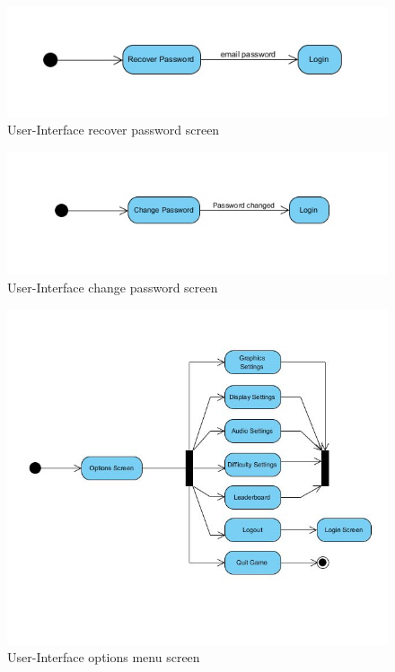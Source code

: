 \documentclass[letterpaper]{article}
\begin{document}
					\begin{figure}[H]
					\centering
					\includegraphics[width=180mm]{UML_Diagram/Activity/recoverpassword.jpg}
					\caption{User-Interface recover password screen}
					\label{overflow}
					\end{figure}
					
					\begin{figure}[H]
					\centering
					\includegraphics[width=180mm]{UML_Diagram/Activity/changepassword.jpg}
					\caption{User-Interface change password screen}
					\label{overflow}
					\end{figure}
					
					\begin{figure}[H]
					\centering
					\includegraphics[width=180mm]{UML_Diagram/Activity/optionsscreen.jpg}
					\caption{User-Interface options menu screen}
					\label{overflow}
					\end{figure}
				
\end{document}
